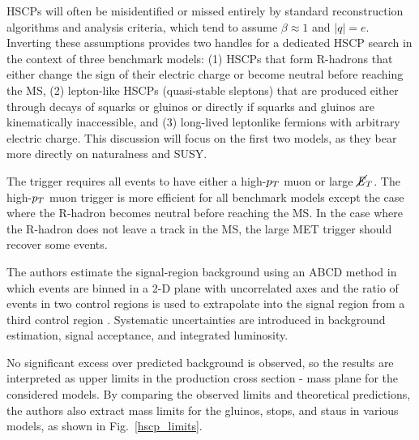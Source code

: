 \documentclass[12pt]{article}
\begin{document}
        HSCPs will often be misidentified or missed entirely by standard reconstruction algorithms and analysis criteria, which tend to assume $\beta \approx \num{1}$ and $\lvert q \rvert = e$. Inverting these assumptions provides two handles for a dedicated HSCP search in the context of three benchmark models: (1) HSCPs that form R-hadrons that either change the sign of their electric charge or become neutral before reaching the MS, (2) lepton-like HSCPs (quasi-stable sleptons) that are produced either through decays of squarks or gluinos or directly if squarks and gluinos are kinematically inaccessible, and (3) long-lived leptonlike fermions with arbitrary electric charge. This discussion will focus on the first two models, as they bear more directly on naturalness and SUSY.

         

        The trigger requires all events to have either a high-$p_T$ muon or large $\cancel{\it{E}}_{T}$. The high-$p_T$ muon trigger is more efficient for all benchmark models except the case where the R-hadron becomes neutral before reaching the MS. In the case where the R-hadron does not leave a track in the MS, the large MET trigger should recover some events.  

        The authors estimate the signal-region background using an ABCD method in which events are binned in a 2-D plane with uncorrelated axes and the ratio of events in two control regions is used to extrapolate into the signal region from a third control region . Systematic uncertainties are introduced in background estimation, signal acceptance, and integrated luminosity.

        No significant excess over predicted background is observed, so the results are interpreted as upper limits in the production cross section - mass plane for the considered models. By comparing the observed limits and theoretical predictions, the authors also extract mass limits for the gluinos, stops, and staus in various models, as shown in Fig.~\ref{hscp_limits}.
\end{document}

